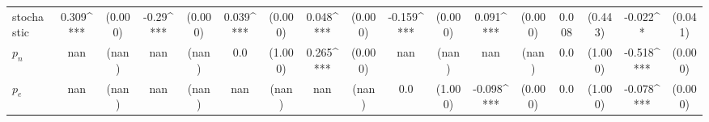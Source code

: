 \begin{tabular}{lcccccccccccccccc}
stochastic & 0.309^{***} & (0.000) & -0.29^{***} & (0.000) & 0.039^{***} & (0.000) & 0.048^{***} & (0.000) & -0.159^{***} & (0.000) & 0.091^{***} & (0.000) & 0.008 & (0.443) & -0.022^{*} & (0.041) \\
$p_n$ & nan & (nan) & nan & (nan) & 0.0 & (1.000) & 0.265^{***} & (0.000) & nan & (nan) & nan & (nan) & 0.0 & (1.000) & -0.518^{***} & (0.000) \\
$p_e$ & nan & (nan) & nan & (nan) & nan & (nan) & nan & (nan) & 0.0 & (1.000) & -0.098^{***} & (0.000) & 0.0 & (1.000) & -0.078^{***} & (0.000) \\
\bottomrule
\end{tabular}

